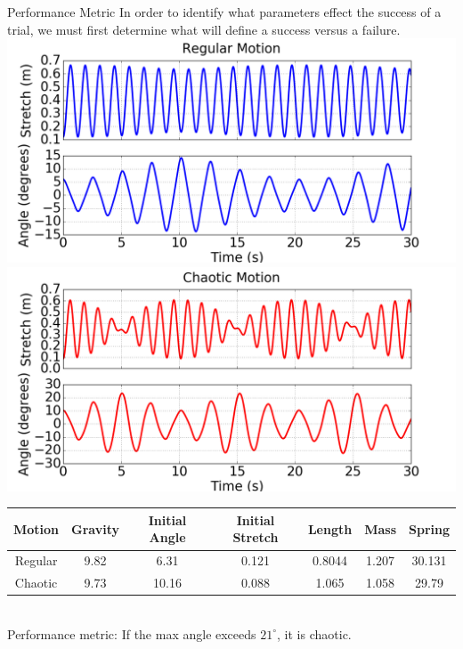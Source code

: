 \documentclass{beamer}
\begin{document}
\begin{frame}{Performance Metric}
\centering
In order to identify what parameters effect the success of a trial, we must first determine what will define a success versus a failure.\newline \newline
\includegraphics[scale=0.18]{images/RegularMotion.png} 
\includegraphics[scale=0.18]{images/ChaoticMotion.png} \\
\vspace{12 pt}
\small
    \begin{tabular}{| c | c | c | c | c | c | c |}
    \hline
    Motion & Gravity & Initial Angle & Initial Stretch & Length & Mass & Spring \\ \hline
    Regular & 9.82 & 6.31 & 0.121 & 0.8044 & 1.207 & 30.131 \\ 
    Chaotic & 9.73 & 10.16 & 0.088 & 1.065 & 1.058 & 29.79 \\ \hline
\end{tabular} \\
\vspace{10 pt}
Performance metric: If the max angle exceeds $21^{\circ}$, it is chaotic.
\end{frame}
\end{document}
